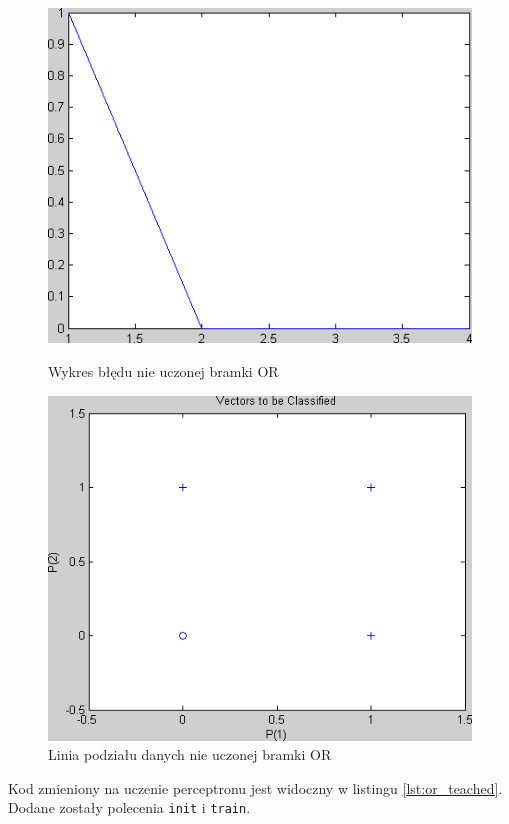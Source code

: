 \documentclass[pointlessnumbers, abstracton, headsepline, a4paper]{scrartcl}
\begin{document}
\begin{figure}[h]
\centering
\begin{minipage}{0.4\textwidth}
\includegraphics[scale=0.4]{figures/or_error_unlearned.png}
\caption{\label{fig:or_error_unlearned}Wykres błędu nie uczonej bramki OR}
\end{minipage}
\qquad
\begin{minipage}{0.4\textwidth}
\includegraphics[scale=0.4]{figures/or_data_unlearned.png}
\caption{\label{fig:or_data_unlearned}Linia podziału danych nie uczonej bramki OR}
\end{minipage}
\end{figure}

Kod zmieniony na uczenie perceptronu jest widoczny w listingu \ref{lst:or_teached}. Dodane zostały polecenia \texttt{init} i \texttt{train}.
\end{document}
